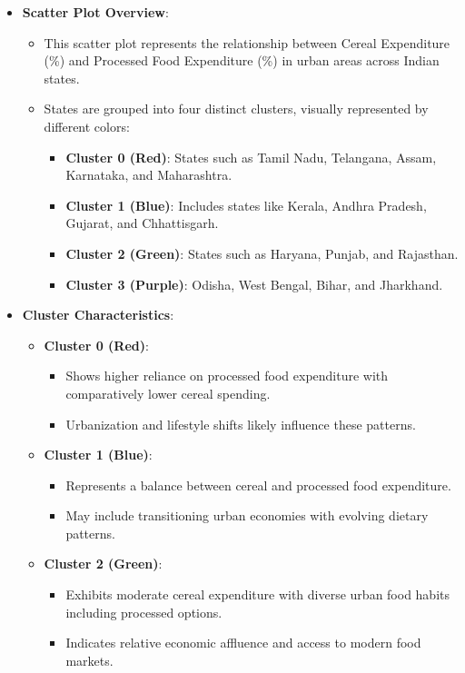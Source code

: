 \documentclass{article}
\begin{document}
\begin{itemize}
	\item \textbf{Scatter Plot Overview}: 
	\begin{itemize}
		\item This scatter plot represents the relationship between Cereal Expenditure (\%) and Processed Food Expenditure (\%) in urban areas across Indian states.
		\item States are grouped into four distinct clusters, visually represented by different colors:
		\begin{itemize}
			\item \textbf{Cluster 0 (Red)}: States such as Tamil Nadu, Telangana, Assam, Karnataka, and Maharashtra.
			\item \textbf{Cluster 1 (Blue)}: Includes states like Kerala, Andhra Pradesh, Gujarat, and Chhattisgarh.
			\item \textbf{Cluster 2 (Green)}: States such as Haryana, Punjab, and Rajasthan.
			\item \textbf{Cluster 3 (Purple)}: Odisha, West Bengal, Bihar, and Jharkhand.
		\end{itemize}
	\end{itemize}
	\item \textbf{Cluster Characteristics}:
	\begin{itemize}
		\item \textbf{Cluster 0 (Red)}:
		\begin{itemize}
			\item Shows higher reliance on processed food expenditure with comparatively lower cereal spending.
			\item Urbanization and lifestyle shifts likely influence these patterns.
		\end{itemize}
		\item \textbf{Cluster 1 (Blue)}:
		\begin{itemize}
			\item Represents a balance between cereal and processed food expenditure.
			\item May include transitioning urban economies with evolving dietary patterns.
		\end{itemize}
		\item \textbf{Cluster 2 (Green)}:
		\begin{itemize}
			\item Exhibits moderate cereal expenditure with diverse urban food habits including processed options.
			\item Indicates relative economic affluence and access to modern food markets.

\end{itemize}
\end{itemize}
\end{itemize}
\end{document}
